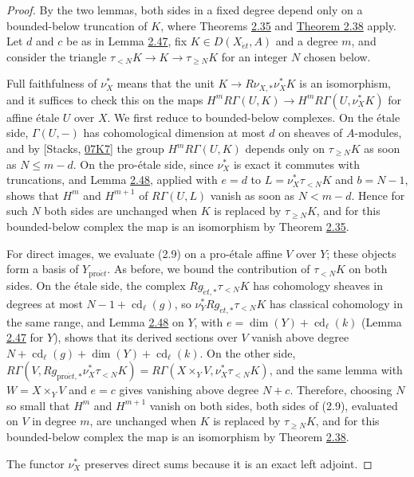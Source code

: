 \documentclass[11pt]{article}
\begin{document}
\begin{proof}[{Proof}]\label{bp145}%
By the two lemmas, both sides in a fixed degree depend only on a bounded-below truncation of \(K\), where Theorems \hyperref[bp101]{2.35} and \hyperref[bp111]{Theorem 2.38} apply. Let \(d\) and \(c\) be as in Lemma \hyperref[bp140]{2.47}, fix \(K\in
D(X_{\acute{e}t},A)\) and a degree \(m\), and consider the triangle \(\tau_{<N}K\to K\to\tau_{\geq N}K\) for an integer \(N\) chosen below.

Full faithfulness of \(\nu_X^*\) means that the unit \(K\to R\nu_{X,*}\nu_X^*K\) is an isomorphism, and it suffices to check this on the maps \(H^mR\Gamma(U,K)\to H^mR\Gamma(U,\nu_X^*K)\) for affine étale \(U\) over \(X\). We first reduce to bounded-below complexes. On the étale side, \(\Gamma(U,-)\) has cohomological dimension at most \(d\) on sheaves of \(A\)-modules, and by [Stacks, \href{https://stacks.math.columbia.edu/tag/07K7}{07K7}] the group \(H^mR\Gamma(U,K)\) depends only on \(\tau_{\geq N}K\) as soon as \(N\leq m-d\). On the pro-étale side, since \(\nu_X^*\) is exact it commutes with truncations, and Lemma \hyperref[bp142]{2.48}, applied with \(e=d\) to \(L=\nu_X^*\tau_{<N}K\) and \(b=N-1\), shows that \(H^m\) and \(H^{m+1}\) of \(R\Gamma(U,L)\) vanish as soon as \(N<m-d\). Hence for such \(N\) both sides are unchanged when \(K\) is replaced by \(\tau_{\geq N}K\), and for this bounded-below complex the map is an isomorphism by Theorem \hyperref[bp101]{2.35}.

For direct images, we evaluate (2.9) on a pro-étale affine \(V\) over \(Y\); these objects form a basis of \(Y_{\mathrm{pro}\acute{e}t}\). As before, we bound the contribution of \(\tau_{<N}K\) on both sides. On the étale side, the complex \(Rg_{\acute{e}t,*}\tau_{<N}K\) has cohomology sheaves in degrees at most \(N-1+\operatorname{cd}_\ell(g)\), so \(\nu_Y^*Rg_{\acute{e}t,*}\tau_{<N}K\) has classical cohomology in the same range, and Lemma \hyperref[bp142]{2.48} on \(Y\), with \(e=\dim(Y)+\operatorname{cd}_\ell(k)\) (Lemma \hyperref[bp140]{2.47} for \(Y\)), shows that its derived sections over \(V\) vanish above degree \(N+\operatorname{cd}_\ell(g)+\dim(Y)+\operatorname{cd}_\ell(k)\). On the other side, \(R\Gamma(V,Rg_{\mathrm{pro}\acute{e}t,*}\nu_X^*\tau_{<N}K)=R\Gamma(X\times_YV,\nu_X^*\tau_{<N}K)\), and the same lemma with \(W=X\times_YV\) and \(e=c\) gives vanishing above degree \(N+c\). Therefore, choosing \(N\) so small that \(H^m\) and \(H^{m+1}\) vanish on both sides, both sides of (2.9), evaluated on \(V\) in degree \(m\), are unchanged when \(K\) is replaced by \(\tau_{\geq N}K\), and for this bounded-below complex the map is an isomorphism by Theorem \hyperref[bp111]{2.38}.

The functor \(\nu_X^*\) preserves direct sums because it is an exact left adjoint.
\end{proof}
\end{document}
